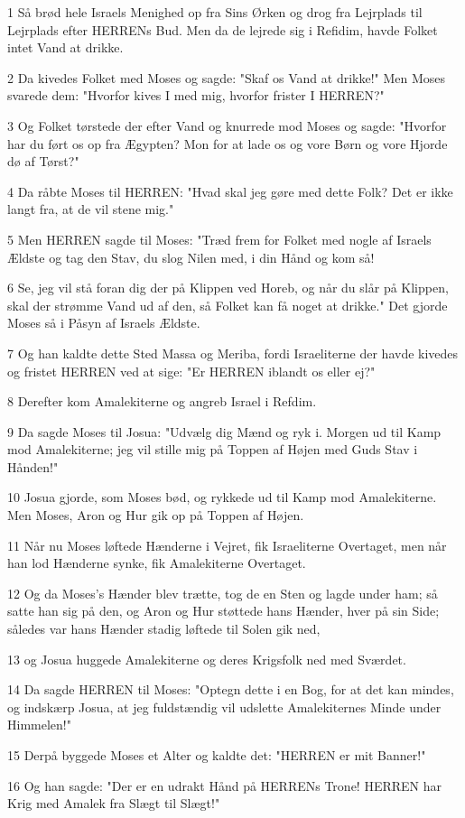 \par 1 Så brød hele Israels Menighed op fra Sins Ørken og drog fra Lejrplads til Lejrplads efter HERRENs Bud. Men da de lejrede sig i Refidim, havde Folket intet Vand at drikke.
\par 2 Da kivedes Folket med Moses og sagde: "Skaf os Vand at drikke!" Men Moses svarede dem: "Hvorfor kives I med mig, hvorfor frister I HERREN?"
\par 3 Og Folket tørstede der efter Vand og knurrede mod Moses og sagde: "Hvorfor har du ført os op fra Ægypten? Mon for at lade os og vore Børn og vore Hjorde dø af Tørst?"
\par 4 Da råbte Moses til HERREN: "Hvad skal jeg gøre med dette Folk? Det er ikke langt fra, at de vil stene mig."
\par 5 Men HERREN sagde til Moses: "Træd frem for Folket med nogle af Israels Ældste og tag den Stav, du slog Nilen med, i din Hånd og kom så!
\par 6 Se, jeg vil stå foran dig der på Klippen ved Horeb, og når du slår på Klippen, skal der strømme Vand ud af den, så Folket kan få noget at drikke." Det gjorde Moses så i Påsyn af Israels Ældste.
\par 7 Og han kaldte dette Sted Massa og Meriba, fordi Israeliterne der havde kivedes og fristet HERREN ved at sige: "Er HERREN iblandt os eller ej?"
\par 8 Derefter kom Amalekiterne og angreb Israel i Refdim.
\par 9 Da sagde Moses til Josua: "Udvælg dig Mænd og ryk i. Morgen ud til Kamp mod Amalekiterne; jeg vil stille mig på Toppen af Højen med Guds Stav i Hånden!"
\par 10 Josua gjorde, som Moses bød, og rykkede ud til Kamp mod Amalekiterne. Men Moses, Aron og Hur gik op på Toppen af Højen.
\par 11 Når nu Moses løftede Hænderne i Vejret, fik Israeliterne Overtaget, men når han lod Hænderne synke, fik Amalekiterne Overtaget.
\par 12 Og da Moses's Hænder blev trætte, tog de en Sten og lagde under ham; så satte han sig på den, og Aron og Hur støttede hans Hænder, hver på sin Side; således var hans Hænder stadig løftede til Solen gik ned,
\par 13 og Josua huggede Amalekiterne og deres Krigsfolk ned med Sværdet.
\par 14 Da sagde HERREN til Moses: "Optegn dette i en Bog, for at det kan mindes, og indskærp Josua, at jeg fuldstændig vil udslette Amalekiternes Minde under Himmelen!"
\par 15 Derpå byggede Moses et Alter og kaldte det: "HERREN er mit Banner!"
\par 16 Og han sagde: "Der er en udrakt Hånd på HERRENs Trone! HERREN har Krig med Amalek fra Slægt til Slægt!"


